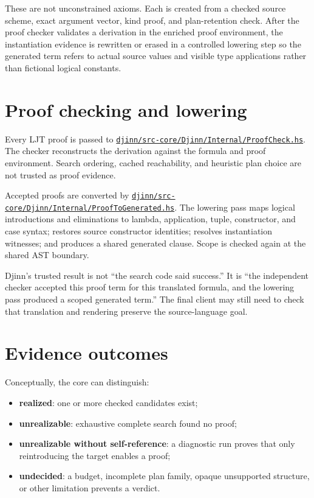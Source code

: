 \documentclass[10pt,letterpaper,oneside]{report}
\def\DjexBase{https://github.com/VladimirReshetnikov/Djex/blob/e454757d53ec057238c22fc6cd0d935b7d96b3dc/}
\newcommand{\dpath}[1]{\href{\DjexBase#1}{\nolinkurl{#1}}}
\newcommand{\term}[1]{\textbf{#1}}
\begin{document}
These are not unconstrained axioms. Each is created from a checked source scheme, exact argument vector, kind proof, and plan-retention check. After the proof checker validates a derivation in the enriched proof environment, the instantiation evidence is rewritten or erased in a controlled lowering step so the generated term refers to actual source values and visible type applications rather than fictional logical constants.

\section{Proof checking and lowering}

Every LJT proof is passed to \dpath{djinn/src-core/Djinn/Internal/ProofCheck.hs}. The checker reconstructs the derivation against the formula and proof environment. Search ordering, cached reachability, and heuristic plan choice are not trusted as proof evidence.

Accepted proofs are converted by \dpath{djinn/src-core/Djinn/Internal/ProofToGenerated.hs}. The lowering pass maps logical introductions and eliminations to lambda, application, tuple, constructor, and case syntax; restores source constructor identities; resolves instantiation witnesses; and produces a shared generated clause. Scope is checked again at the shared AST boundary.

\begin{invariantbox}
Djinn's trusted result is not ``the search code said success.'' It is ``the independent checker accepted this proof term for this translated formula, and the lowering pass produced a scoped generated term.'' The final client may still need to check that translation and rendering preserve the source-language goal.
\end{invariantbox}

\section{Evidence outcomes}

Conceptually, the core can distinguish:

\begin{itemize}
  \item \term{realized}: one or more checked candidates exist;
  \item \term{unrealizable}: exhaustive complete search found no proof;
  \item \term{unrealizable without self-reference}: a diagnostic run proves that only reintroducing the target enables a proof;
  \item \term{undecided}: a budget, incomplete plan family, opaque unsupported structure, or other limitation prevents a verdict.
\end{itemize}
\end{document}
